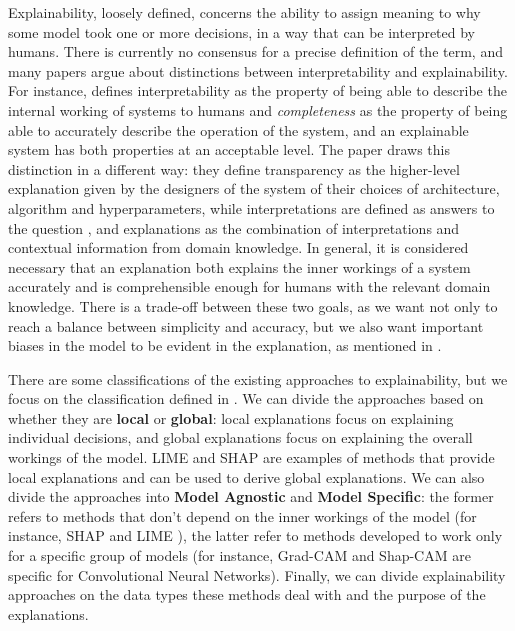 Explainability, loosely defined, concerns the ability to assign meaning to why some model took one or more decisions, in a way that can be interpreted by humans. There is currently no consensus for a precise definition of the term, and many papers argue about distinctions between interpretability and explainability. For instance, \cite{Explaining Explanations: An Overview of Interpretability of Machine Learning} defines interpretability as the property of being able to describe the internal working of systems to humans and \textit{completeness} as the property of being able to accurately describe the operation of the system, and an explainable system has both properties at an acceptable level. The paper \cite{Explainable Machine Learning for Scientific Insights and Discoveries} draws this distinction in a different way: they define transparency as the higher-level explanation given by the designers of the system of their choices of architecture, algorithm and hyperparameters, while interpretations are defined as answers to the question , and explanations as the combination of interpretations and contextual information from domain knowledge. In general, it is considered necessary that an explanation both explains the inner workings of a system accurately and is comprehensible enough for humans with the relevant domain knowledge. There is a trade-off between these two goals, as we want not only to reach a balance between simplicity and accuracy, but we also want important biases in the model to be evident in the explanation, as mentioned in \cite{Explaining Explanations: An Overview of Interpretability of Machine Learning}.

There are some classifications of the existing approaches to explainability, but we focus on the classification defined in \cite{Explainable AI: A Review of Machine Learning Interpretability Methods}. We can divide the approaches based on whether they are \textbf{local} or \textbf{global}: local explanations focus on explaining individual decisions, and global explanations focus on explaining the overall workings of the model. LIME \cite{lime} and SHAP \cite{shap} are examples of methods that provide local explanations and can be used to derive global explanations. We can also divide the approaches into \textbf{Model Agnostic} and \textbf{Model Specific}: the former refers to methods that don't depend on the inner workings of the model (for instance, SHAP \cite{shap} and LIME \cite{lime}), the latter refer to methods developed to work only for a specific group of models (for instance, Grad-CAM and Shap-CAM are specific for Convolutional Neural Networks). Finally, we can divide explainability approaches on the data types these methods deal with and the purpose of the explanations.

